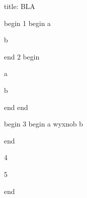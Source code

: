 title: BLA

begin
1
begin
a

b

end
2
begin

a

b

end
end

begin
3
begin
a
wyxnob
b

end

4

5

end
